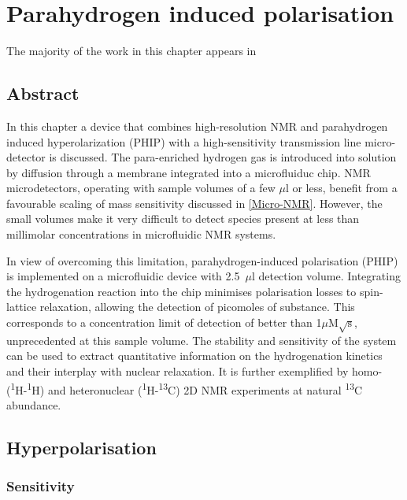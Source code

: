 
\chapter{Parahydrogen induced polarisation}\label{Parahydrogen}

 The majority of the work in this chapter appears in \citep{eills2019high}

\section{Abstract}
In this chapter a device that combines high-resolution NMR and parahydrogen induced hyperolarization (PHIP)
with a high-sensitivity transmission line micro-detector is discussed.
The para-enriched hydrogen gas is introduced into solution by diffusion
through a membrane integrated into a microfluiduc chip.
NMR microdetectors, operating with sample volumes of a few $\mu$l or less,
benefit from a favourable scaling of mass sensitivity discussed
in \ref{Micro-NMR}. However, the small volumes make it very difficult to
detect species present at less
than millimolar concentrations in microfluidic NMR systems.

In view of
overcoming this limitation, parahydrogen-induced polarisation
(PHIP) is implemented on a microfluidic device with 2.5~$\mu$l detection volume.
Integrating the hydrogenation reaction into the chip minimises polarisation
losses to spin-lattice relaxation, allowing the detection of picomoles of
substance. This corresponds to a concentration limit of detection of better than
1$\mu$M$\sqrt{\text{s}}$, unprecedented at this sample volume.  The
stability and sensitivity of the  system can be used to extract
quantitative information on the hydrogenation kinetics and
their interplay with nuclear relaxation. It is further exemplified by homo-
(\textsuperscript{1}H-\textsuperscript{1}H) and heteronuclear
(\textsuperscript{1}H-\textsuperscript{13}C) 2D NMR experiments
 at natural \textsuperscript{13}C abundance.

 \section{Hyperpolarisation}


 \subsection{Sensitivity}\label{Sensitivity}

